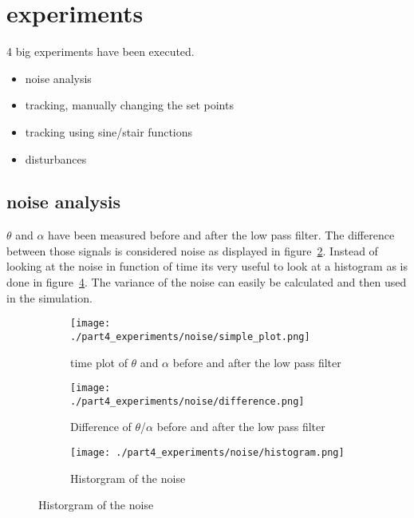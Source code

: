 \section{experiments}

	4 big experiments have been executed.
	
	\begin{itemize}
		\item noise analysis
		\item tracking, manually changing the set points
		\item tracking using sine/stair functions
		\item disturbances
	\end{itemize}


\subsection{noise analysis}
	$\theta$ and $\alpha$ have been measured before and after the low pass filter. The difference between those signals is considered noise as displayed in figure~\ref{fig:time plot noise}. Instead of looking at the noise in function of time its very useful to look at a histogram as is done in figure~\ref{fig:hist noise}. The variance of the noise can easily be calculated and then used in the simulation.
	
	\begin{figure}[H]
		\centering
		\begin{subfigure}[b]{0.45\textwidth}
			\texttt{[image: ./part4\_experiments/noise/simple\_plot.png]}
			\caption{time plot of $\theta$ and $\alpha$ before and after the low pass filter}
			\label{fig:time plot theta and alpha}
		\end{subfigure}
		\begin{subfigure}[b]{0.45\textwidth}
			\texttt{[image: ./part4\_experiments/noise/difference.png]}
			\caption{Difference of $\theta$/$\alpha$ before and after the low pass filter}
			\label{fig:time plot noise}
		\end{subfigure}
		\begin{subfigure}[b]{0.45\textwidth}
			\texttt{[image: ./part4\_experiments/noise/histogram.png]}
			\caption{Historgram of the noise}
			\label{fig:hist noise}
		\end{subfigure}
	\end{figure}

